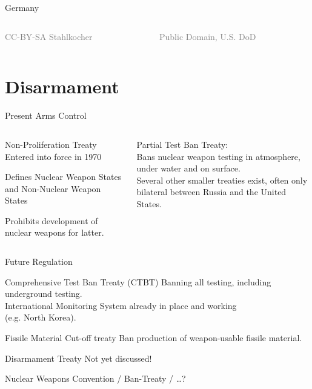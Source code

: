\documentclass[presentation]{beamer}
\begin{document}
\begin{frame}[label=sec-1-9]{Germany}
\begin{columns}
\begin{column}{0.48\textwidth}
\tiny \textcolor{gray}{CC-BY-SA Stahlkocher}
\end{column}

\begin{column}{0.48\textwidth}
\tiny \textcolor{gray}{Public Domain, U.S. DoD}
\end{column}
\end{columns}
\end{frame}


\section{Disarmament}
\label{sec-2}
\begin{frame}[label=sec-2-1]{Present Arms Control}
\begin{columns}[t]

\begin{column}{0.48\textwidth}
\begin{block}{Non-Proliferation Treaty}
Entered into force in 1970

Defines \alert{Nuclear Weapon States} and \alert{Non-Nuclear Weapon States}

Prohibits development of nuclear weapons for latter.
\end{block}
\end{column}

\begin{column}{0.48\textwidth}

\vspace{0.1cm}

Partial Test Ban Treaty:\\
     Bans nuclear weapon testing in atmosphere, under water and on surface.\\[1.2em]

Several other smaller treaties exist, often only bilateral between Russia and the United States.
\end{column}
\end{columns}
\end{frame}

\begin{frame}[label=sec-2-2]{Future Regulation}
\begin{block}{Comprehensive Test Ban Treaty (CTBT)}
Banning all testing, including underground testing.\\
      International Monitoring System already in place \alert{and working}\\
      (e.g. North Korea).
\end{block}


\begin{block}{Fissile Material Cut-off treaty}
Ban production of weapon-usable fissile material.
\end{block}


\begin{block}{Disarmament Treaty}
Not yet discussed!

Nuclear Weapons Convention / Ban-Treaty / \ldots{}?
\end{block}
\end{frame}
\end{document}
